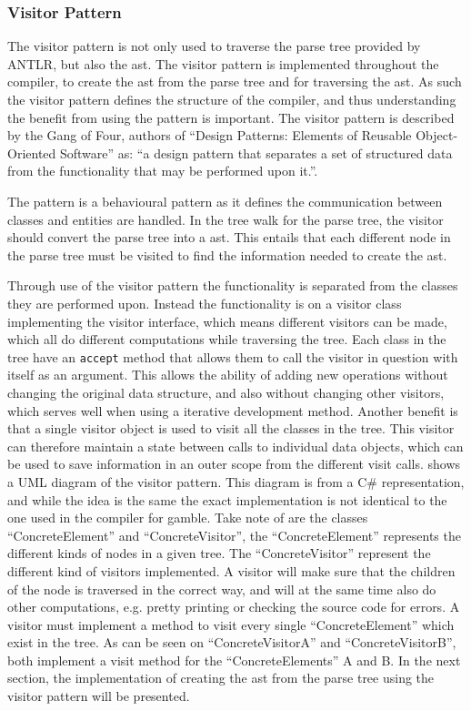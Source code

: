\subsubsection*{Visitor Pattern}\label{subs:visit}
The visitor pattern is not only used to traverse the parse tree provided by ANTLR, but also the \acrshort{ast}.
The visitor pattern is implemented throughout the compiler, to create the \acrshort{ast} from the parse tree and for traversing the \acrshort{ast}.
As such the visitor pattern defines the structure of the compiler, and thus understanding the benefit from using the pattern is important.
The visitor pattern is described by the Gang of Four, authors of ``Design Patterns: Elements of Reusable Object-Oriented Software'' as:
``a design pattern that separates a set of structured data from the functionality that may be performed upon it.''. \citep{GOF}

The pattern is a behavioural pattern as it defines the communication between classes and entities are handled.
In the tree walk for the parse tree, the visitor should convert the parse tree into a \acrshort{ast}.
This entails that each different node in the parse tree must be visited to find the information needed to create the \acrshort{ast}.

Through use of the visitor pattern the functionality is separated from the classes they are performed upon. 
Instead the functionality is on a visitor class implementing the visitor interface, which means different visitors can be made, which all do different computations while traversing the tree.
Each class in the tree have an \texttt{accept} method that allows them to call the visitor in question with itself as an argument.
This allows the ability of adding new operations without changing the original data structure, and also without changing other visitors, which serves well when using a iterative development method.
Another benefit is that a single visitor object is used to visit all the classes in the tree.
This visitor can therefore maintain a state between calls to individual data objects, which can be used to save information in an outer scope from the different visit calls.
 shows a UML diagram of the visitor pattern.
This diagram is from a C\# representation, and while the idea is the same the exact implementation is not identical to the one used in the compiler for \gls{gamble}.
Take note of are the classes ``ConcreteElement'' and ``ConcreteVisitor'', the ``ConcreteElement'' represents the different kinds of nodes in a given tree.
The ``ConcreteVisitor'' represent the different kind of visitors implemented.
A visitor will make sure that the children of the node is traversed in the correct way, and will at the same time also do other computations, e.g. pretty printing or checking the source code for errors.
A visitor must implement a method to visit every single ``ConcreteElement'' which exist in the tree.
As can be seen on  ``ConcreteVisitorA'' and ``ConcreteVisitorB'', both implement a visit method for the ``ConcreteElements'' A and B.
In the next section, the implementation of creating the \acrshort{ast} from the parse tree using the visitor pattern will be presented.

